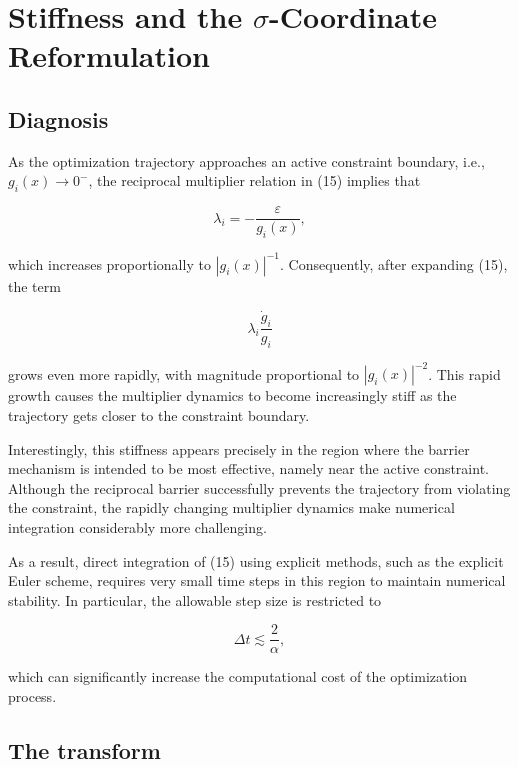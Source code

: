 \documentclass[11pt,onecolumn]{article}
\theoremstyle{definition}
\theoremstyle{remark}
\begin{document}
\section{Stiffness and the $\sigma$-Coordinate Reformulation} \label{sec:sigma}

\subsection{Diagnosis}


As the optimization trajectory approaches an active constraint boundary, i.e., $g_i(x)\rightarrow 0^{-}$, the reciprocal multiplier relation in (15) implies that

\[
\lambda_i=-\frac{\varepsilon}{g_i(x)},
\]

which increases proportionally to $|g_i(x)|^{-1}$. Consequently, after expanding (15), the term

\[
\lambda_i\frac{\dot{g}_i}{g_i}
\]

grows even more rapidly, with magnitude proportional to $|g_i(x)|^{-2}$. This rapid growth causes the multiplier dynamics to become increasingly stiff as the trajectory gets closer to the constraint boundary.

Interestingly, this stiffness appears precisely in the region where the barrier mechanism is intended to be most effective, namely near the active constraint. Although the reciprocal barrier successfully prevents the trajectory from violating the constraint, the rapidly changing multiplier dynamics make numerical integration considerably more challenging.

As a result, direct integration of (15) using explicit methods, such as the explicit Euler scheme, requires very small time steps in this region to maintain numerical stability. In particular, the allowable step size is restricted to

\[
\Delta t \lesssim \frac{2}{\alpha},
\]

which can significantly increase the computational cost of the optimization process.
\subsection{The transform}
\end{document}
